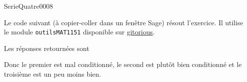 
\begin{corrige}{SerieQuatre0008}

	Le code suivant (à copier-coller dans un fenêtre Sage) résout l'exercice. Il utilise le module \verb+outilsMAT1151+ disponible sur \href{http://www.gitorious.org/math1151}{gitorious}.


	Les réponses retournées sont


	Donc le premier est mal conditionné, le second est plutôt bien conditionné et le troisième est un peu moins bien.	

\end{corrige}
